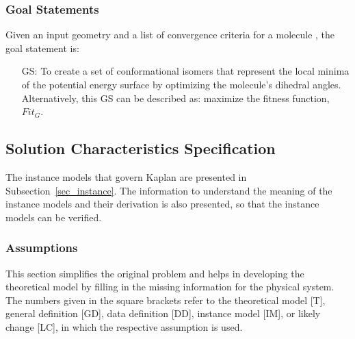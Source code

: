 \documentclass[12pt]{article}
\newcounter{goalnum} %
\newcommand{\progname}{Kaplan} %
\begin{document}


\subsubsection{Goal Statements}

\noindent Given an input geometry and a list of convergence criteria for a 
molecule , the goal statement is:

\begin{itemize}

\item[GS\refstepcounter{goalnum}\thegoalnum \label{goal}:] To 
create a set of conformational isomers that represent the local minima of the 
potential energy surface by optimizing the molecule's 
dihedral angles. 
Alternatively, this GS can be described as: maximize the fitness function, 
$Fit_G$.

\end{itemize}

\subsection{Solution Characteristics Specification}

The instance models that govern \progname{} are presented in
Subsection~\ref{sec_instance}.  The information to understand the meaning of the
instance models and their derivation is also presented, so that the instance
models can be verified.

\subsubsection{Assumptions}

This section simplifies the original problem and helps in developing the
theoretical model by filling in the missing information for the physical
system. The numbers given in the square brackets refer to the theoretical model
[T], general definition [GD], data definition [DD], instance model [IM], or
likely change [LC], in which the respective assumption is used.
\end{document}
